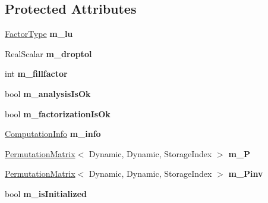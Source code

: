 \subsection*{Protected Attributes}
\begin{DoxyCompactItemize}
\item 
\mbox{\label{class_eigen_1_1_incomplete_l_u_t_ae2f1c31f87874392c955fab460511d21}} 
\mbox{\hyperlink{class_eigen_1_1_sparse_matrix}{Factor\+Type}} {\bfseries m\+\_\+lu}
\item 
\mbox{\label{class_eigen_1_1_incomplete_l_u_t_a5eb0796236f8b99cf24a991b4fe31813}} 
Real\+Scalar {\bfseries m\+\_\+droptol}
\item 
\mbox{\label{class_eigen_1_1_incomplete_l_u_t_a40e52676389d807c3033de03bbd7b90a}} 
int {\bfseries m\+\_\+fillfactor}
\item 
\mbox{\label{class_eigen_1_1_incomplete_l_u_t_a3e304af30544b5e1b3396d017a657b26}} 
bool {\bfseries m\+\_\+analysis\+Is\+Ok}
\item 
\mbox{\label{class_eigen_1_1_incomplete_l_u_t_a3f28ba1a776a45e098ddfc35425710b7}} 
bool {\bfseries m\+\_\+factorization\+Is\+Ok}
\item 
\mbox{\label{class_eigen_1_1_incomplete_l_u_t_a7d2cda3cd944579c417a9adf423edc9f}} 
\mbox{\hyperlink{group__enums_ga85fad7b87587764e5cf6b513a9e0ee5e}{Computation\+Info}} {\bfseries m\+\_\+info}
\item 
\mbox{\label{class_eigen_1_1_incomplete_l_u_t_af3553f5fb7aa859106c03939e9979635}} 
\mbox{\hyperlink{class_eigen_1_1_permutation_matrix}{Permutation\+Matrix}}$<$ Dynamic, Dynamic, Storage\+Index $>$ {\bfseries m\+\_\+P}
\item 
\mbox{\label{class_eigen_1_1_incomplete_l_u_t_a652cc8edb84b570f762272f7b63f4238}} 
\mbox{\hyperlink{class_eigen_1_1_permutation_matrix}{Permutation\+Matrix}}$<$ Dynamic, Dynamic, Storage\+Index $>$ {\bfseries m\+\_\+\+Pinv}
\item 
\mbox{\label{class_eigen_1_1_incomplete_l_u_t_ac52101f69d048d5c4b036eadf1f13673}} 
bool {\bfseries m\+\_\+is\+Initialized}
\end{DoxyCompactItemize}



